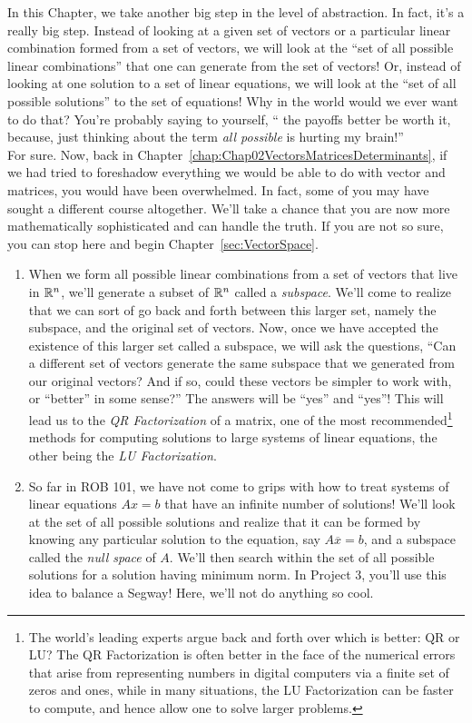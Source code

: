 In this Chapter, we take another big step in the level of abstraction. In fact, it's a really big step. Instead of looking at a given set of vectors or a particular linear combination formed from a set of vectors, we will look at the ``set of all possible linear combinations'' that one can generate from the set of vectors! Or, instead of looking at one solution to a set of linear equations, we will look at the ``set of all possible solutions'' to the set of equations! Why in the world would we ever want to do that? You're probably saying to yourself, `` the payoffs better be worth it, because, just thinking about the term \textit{all possible} is hurting my brain!'' \\

For sure. Now, back in Chapter~\ref{chap:Chap02VectorsMatricesDeterminants}, if we had tried to foreshadow everything we would be able to do with vector and matrices, you would have been overwhelmed. In fact, some of you may have sought a different course altogether. We'll take a chance that you are now more mathematically sophisticated and can handle the truth. If you are not so sure, you can stop here and begin Chapter~\ref{sec:VectorSpace}.

\begin{enumerate}
\renewcommand{\labelenumi}{(\alph{enumi})}
\setlength{\itemsep}{.2cm}
    \item When we form all possible linear combinations from a set of vectors that live in $\mathbb R^n$, we'll generate a subset of $\mathbb R^n$ called a \textit{subspace}. We'll come to realize that we can sort of go back and forth between this larger set, namely the subspace, and the original set of vectors. Now, once we have accepted the existence of this larger set called a subspace, we will ask the questions, ``Can a different set of vectors generate the same subspace that we generated from our original vectors? And if so, could these vectors be simpler to work with, or ``better'' in some sense?'' The answers will be ``yes'' and ``yes''! This will lead us to the \textit{QR Factorization} of a matrix, one of the most recommended\footnote{The world's leading experts argue back and forth over which is better: QR or LU? The QR Factorization is often better in the face of the numerical errors that arise from representing numbers in digital computers via a finite set of zeros and ones, while in many situations, the LU Factorization can be faster to compute, and hence allow one to solve larger problems. } methods for computing solutions to large systems of linear equations, the other being the \textit{LU Factorization}.
    
    \item So far in ROB 101, we have not come to grips with how to treat systems of linear equations $Ax=b$ that have an infinite number of solutions! We'll look at the set of all possible solutions and realize that it can be formed by knowing any particular solution to the equation, say $A \overline{x} = b$, and a subspace called the \textit{null space} of $A$. We'll then search within the set of all possible solutions for a solution having minimum norm. In Project 3, you'll use this idea to balance a Segway! Here, we'll not do anything so cool. 
\end{enumerate} 


